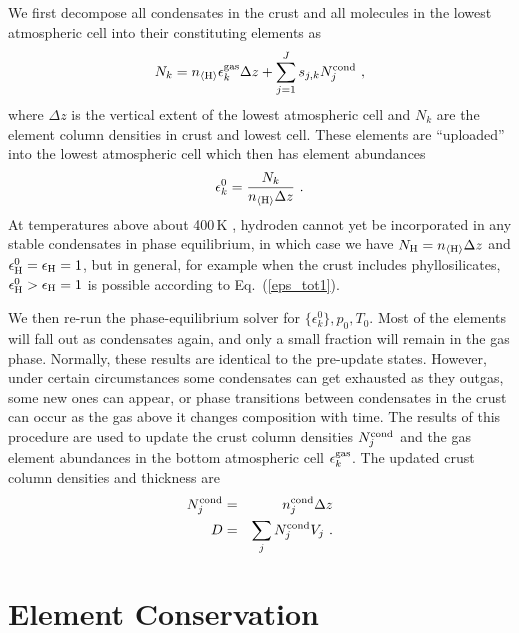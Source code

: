\documentclass[11pt]{article}
\def\nH{n_{\langle\rm H\rangle}}
\def\ek{\epsilon_k}
\begin{document}
We first decompose all condensates in the crust and all molecules in
the lowest atmospheric cell into their constituting elements as
\begin{equation}
  N_k = \nH\ek^{\rm gas}\Delta z + \sum_{j=1}^J s_{j,k}N_j^{\rm cond} \ ,
\end{equation}
where $\Delta z$ is the vertical extent of the lowest atmospheric cell and 
$N_k$ are the element column densities in crust and lowest cell. These
elements are ``uploaded'' into the lowest atmospheric cell which 
then has element abundances
\begin{equation}
  \ek^0 = \frac{N_k}{\nH\Delta z} \ .
  \label{eps_tot1}
\end{equation}
At temperatures above about 400\,K \citep{Woitke2017}, hydroden cannot
yet be incorporated in any stable condensates in phase
equilibrium, in which case we have $N_{\rm H} = \nH\Delta z$ and
$\epsilon_{\rm H}^0 = \epsilon_{\rm H} = 1$, but in general, for
example when the crust includes phyllosilicates, $\epsilon_{\rm H}^0 >
\epsilon_{\rm H} = 1$ is possible according to Eq.~(\ref{eps_tot1}).

We then re-run the phase-equilibrium solver for $\{\ek^0\},p_0,T_0$.
Most of the elements will fall out as condensates again, and only a
small fraction will remain in the gas phase.  Normally, these results
are identical to the pre-update states.  However, under certain
circumstances some condensates can get exhausted as they outgas, some
new ones can appear, or phase transitions between condensates in the
crust can occur as the gas above it changes composition with time. The
results of this procedure are used to update the crust column
densities $N_j^{\rm cond}$ and the gas element abundances in the
bottom atmospheric cell $\ek^{\rm gas}$. The updated crust 
column densities and thickness are
\begin{eqnarray}
  N_j^{\rm cond} &=& n_j^{\rm cond}\Delta z \\
              D &=& \sum_j N_j^{\rm cond} V_j \ .
\end{eqnarray}


\section{Element Conservation}





\end{document}
